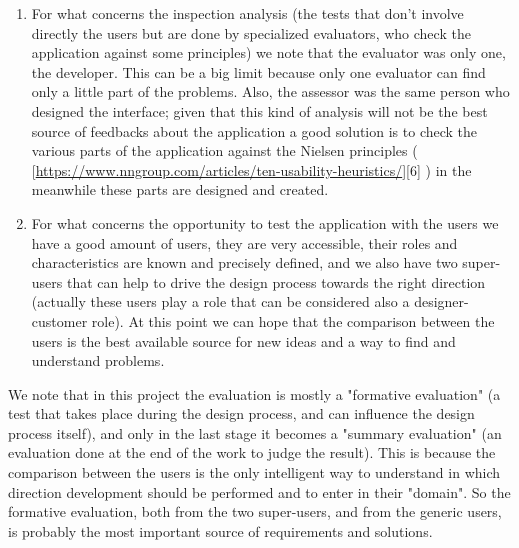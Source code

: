 \begin{enumerate}

\item For what concerns the inspection analysis (the tests that don't involve directly the users but are done by specialized evaluators, who check the application against some principles) we note that the evaluator was only one, the developer. This can be a big limit because only one evaluator can find only a little part of the problems. Also, the assessor was the same person who designed the interface; given that this kind of analysis will not be the best source of feedbacks about the application a good solution is to check the various parts of the application against the Nielsen principles ( [\url{https://www.nngroup.com/articles/ten-usability-heuristics/}][6] ) in the meanwhile these parts are designed and created.

\item For what concerns the opportunity to test the application with the users we have a good amount of users, they are very accessible, their roles and characteristics are known and precisely defined, and we also have two super-users that can help to drive the design process towards the right direction (actually these users play a role that can be considered also a designer-customer role). At this point we can hope that the comparison between the users is the best available source for new ideas and a way to find and understand problems.    

\end{enumerate}

We note that in this project the evaluation is mostly a "formative evaluation" (a test that takes place during the design process, and can influence the design process itself), and only in the last stage it becomes a "summary evaluation" (an evaluation done at the end of the work to judge the result). This is because the comparison between the users is the only intelligent way to understand in which direction development should be performed and to enter in their "domain". So the formative evaluation, both from the two super-users, and from the generic users, is probably the most important source of requirements and solutions.   

